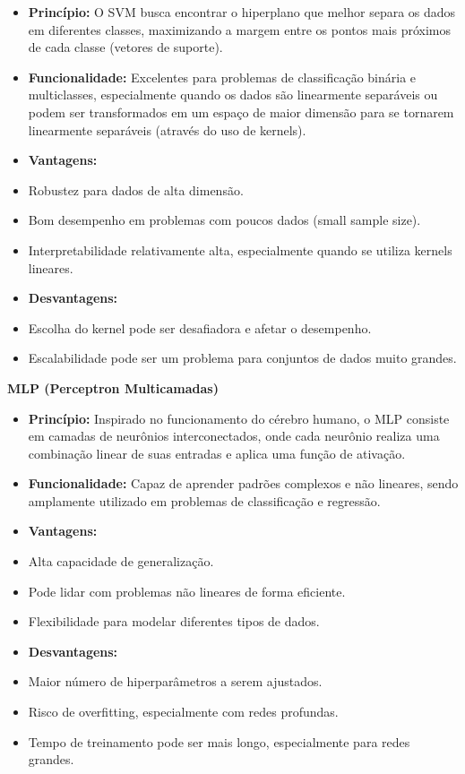 \documentclass[12pt,a4paper,oneside,openany]{article}
\begin{document}
\begin{itemize}
    \item \textbf{Princípio:} O SVM busca encontrar o hiperplano que melhor separa os dados em diferentes classes, maximizando a margem entre os pontos mais próximos de cada classe (vetores de suporte).
    \item \textbf{Funcionalidade:} Excelentes para problemas de classificação binária e multiclasses, especialmente quando os dados são linearmente separáveis ou podem ser transformados em um espaço de maior dimensão para se tornarem linearmente separáveis (através do uso de kernels).
    \item \textbf{Vantagens:}
    \item Robustez para dados de alta dimensão.
    \item Bom desempenho em problemas com poucos dados (small sample size).
    \item Interpretabilidade relativamente alta, especialmente quando se utiliza kernels lineares.
    \item \textbf{Desvantagens:}
    \item Escolha do kernel pode ser desafiadora e afetar o desempenho.
    \item Escalabilidade pode ser um problema para conjuntos de dados muito grandes.
\end{itemize}

\noindent \textbf{MLP (Perceptron Multicamadas)}

\begin{itemize}
    \item \textbf{Princípio:} Inspirado no funcionamento do cérebro humano, o MLP consiste em camadas de neurônios interconectados, onde cada neurônio realiza uma combinação linear de suas entradas e aplica uma função de ativação.
    \item \textbf{Funcionalidade:} Capaz de aprender padrões complexos e não lineares, sendo amplamente utilizado em problemas de classificação e regressão.
    \item \textbf{Vantagens:}
    \item Alta capacidade de generalização.
    \item Pode lidar com problemas não lineares de forma eficiente.
    \item Flexibilidade para modelar diferentes tipos de dados.
    \item \textbf{Desvantagens:}
    \item Maior número de hiperparâmetros a serem ajustados.
    \item Risco de overfitting, especialmente com redes profundas.
    \item Tempo de treinamento pode ser mais longo, especialmente para redes grandes.
\end{itemize}
\end{document}

